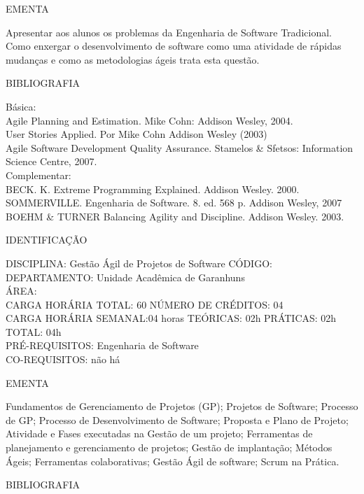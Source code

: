 \documentclass[
	12pt,				%
	openright,			%
  oneside,     %
	a4paper,			%
	english,			%
	french,				%
	spanish,			%
	brazil				%
	]{abntex2}
\begin{document}
\begin{apendicesenv}
EMENTA 

Apresentar aos alunos os problemas da Engenharia de Software
Tradicional. Como enxergar o desenvolvimento de software como uma
atividade de rápidas mudanças e como as metodologias ágeis trata esta
questão.

BIBLIOGRAFIA 

Básica:\\
Agile Planning and Estimation. Mike Cohn: Addison Wesley, 2004.\\
User Stories Applied. Por Mike Cohn  Addison Wesley (2003)\\
Agile Software Development Quality Assurance. Stamelos \& Sfetsos:
Information Science Centre, 2007.\\
Complementar:\\
BECK. K. Extreme Programming Explained. Addison Wesley. 2000.\\
SOMMERVILLE. Engenharia de Software. 8. ed. 568 p. Addison Wesley, 2007\\
BOEHM \& TURNER Balancing Agility and Discipline. Addison Wesley. 2003.

\newpage IDENTIFICAÇÃO

DISCIPLINA: Gestão Ágil de Projetos de Software CÓDIGO: \\
DEPARTAMENTO: Unidade Acadêmica de Garanhuns\\
ÁREA: \\
CARGA HORÁRIA TOTAL: 60 NÚMERO DE CRÉDITOS: 04\\
CARGA HORÁRIA SEMANAL:04 horas TEÓRICAS: 02h PRÁTICAS: 02h TOTAL: 04h\\
PRÉ-REQUISITOS: Engenharia de Software\\
CO-REQUISITOS: não há

EMENTA 

Fundamentos de Gerenciamento de Projetos (GP); Projetos de Software; Processo de GP; Processo de Desenvolvimento de Software; Proposta e Plano de Projeto; Atividade e Fases executadas na Gestão de um projeto; Ferramentas de planejamento e gerenciamento de projetos; Gestão de implantação; Métodos Ágeis; Ferramentas colaborativas; Gestão Ágil de software; Scrum na Prática.

BIBLIOGRAFIA 


\end{apendicesenv}
\end{document}
